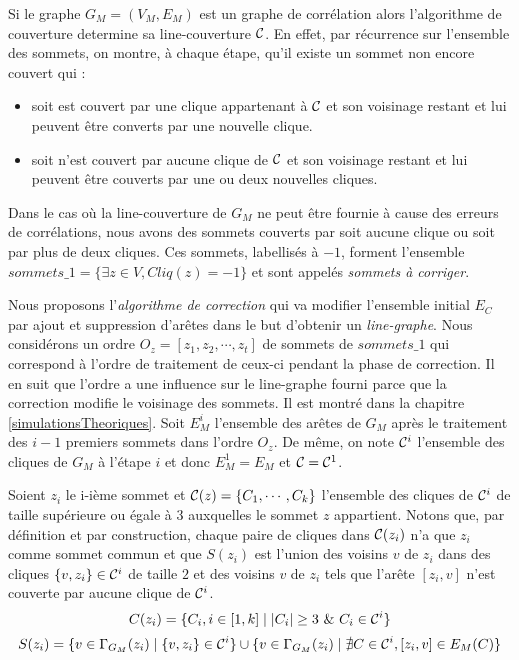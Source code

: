 Si le graphe $G_M=(V_M, E_M)$ est un graphe de corr\'elation alors l'algorithme de couverture determine sa line-couverture $\cal C$.
En effet, par r\'ecurrence sur l'ensemble des sommets, on montre, \`a chaque \'etape, qu'il existe un sommet non encore couvert qui :
\begin{itemize}
\item soit est couvert par une clique appartenant \`a $\cal C$ et son voisinage restant et lui peuvent \^etre converts par une nouvelle clique.
\item soit n'est couvert par aucune clique de  $\cal C$ et son voisinage restant et lui peuvent \^etre couverts par une ou deux nouvelles cliques.
\end{itemize}
Dans le cas o\`u la line-couverture de $G_M$ ne peut \^etre fournie \`a cause des erreurs de corr\'elations, nous avons des sommets couverts par soit aucune clique ou soit par plus de deux cliques. Ces sommets, labellis\'es \`a $-1$, forment l'ensemble 
$sommets\_1 = \{\exists z \in V, Cliq(z) = -1 \}$ 
et sont appel\'es {\em sommets \`a corriger}.
\newline

Nous proposons l'{\em algorithme de correction} qui va modifier l'ensemble initial $E_C$ par ajout et suppression d'ar\^etes dans le but d'obtenir un {\em line-graphe}.
Nous consid\'erons un ordre $O_z = [z_1, z_2, \cdots, z_t]$ de sommets de $sommets\_1$ qui correspond \`a l'ordre de traitement  de ceux-ci pendant la phase de correction.
Il en suit que l'ordre a une influence sur le line-graphe fourni parce que la correction modifie le voisinage des sommets. Il est montr\'e dans la chapitre \ref{simulationsTheoriques}.
\newline
Soit $E_M^i$ l'ensemble des ar\^etes de $G_M$ apr\`es le traitement des $i-1$ premiers sommets dans l'ordre $O_z$. De m\^eme, on note ${\cal C}^i$ l'ensemble des cliques de $G_M$ \`a l'\'etape $i$ et donc $E_M^1 = E_M$ et ${\cal C} = {\cal C}^1$.
\newline

Soient $z_i$ le i-i\`eme sommet et ${\cal C}(z) = \{C_1, \cdots, C_k\}$ l'ensemble des cliques de ${\cal C}^i$ de taille sup\'erieure ou \'egale \`a $3$ auxquelles le sommet $z$ appartient.
Notons que, par d\'efinition et par construction, chaque paire de cliques dans ${\cal C}(z_i)$ n'a que $z_i$ comme sommet commun et que $S(z_i)$ est l'union des voisins $v$ de $z_i$ dans des cliques $\{v,z_i\} \in {\cal C}^i$ de taille $2$ et des voisins $v$ de $z_i$ tels que l'ar\^ete $[z_i,v]$ n'est couverte par aucune clique de ${\cal C}^i$.
\begin{equation}
C(z_i) = \{C_i, i \in [1,k] \mid  |C_i| \ge 3 \mbox{ } \&  \mbox{ } C_i \in {\cal C}^i \} 
\end{equation}
\begin{equation}
S(z_i) = \{v \in \Gamma_{G_M}(z_i) \mid \{v,z_i\} \in {\cal C}^i\} \cup  \{ v \in \Gamma_{G_M}(z_i) \mid \nexists C \in {\cal C}^{i} , [z_i,v] \in E_M(C) \}
\end{equation}

